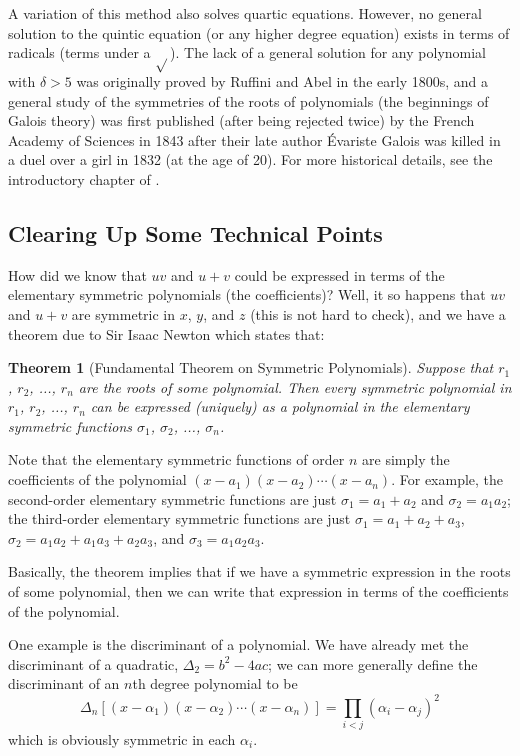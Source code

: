 \documentclass[a4paper,10pt,titlepage]{article}
\newtheorem*{thm}{Theorem}
\theoremstyle{definition}
\begin{document}
A variation of this method also solves quartic equations. However, no general solution to the
quintic equation (or any higher degree equation) exists in terms of radicals (terms under a $ \sqrt{} $).
The lack of a general solution for any polynomial with $ \delta > 5 $ was originally proved by Ruffini
and Abel in the early 1800s, and a general study of the symmetries of the roots of polynomials
(the beginnings of Galois theory) was first published (after being rejected twice) by the
French Academy of Sciences in 1843 after their late author \'Evariste Galois was killed in a duel
over a girl in 1832 (at the age of 20). For more historical details, see the introductory chapter
of \cite{Ste15}.

\subsection*{Clearing Up Some Technical Points}
How did we know that $ uv $ and $ u + v $ could be expressed in terms of the elementary
symmetric polynomials (the coefficients)? Well, it so happens that $ uv $ and $ u + v $ are
symmetric in $ x $, $ y $, and $ z $ (this is not hard to check), and we have a theorem due
to Sir Isaac Newton which states that:
\begin{thm}[Fundamental Theorem on Symmetric Polynomials]
  Suppose that $ r_1 $, $ r_2 $, ..., $ r_n $ are the roots of some polynomial. Then every
  symmetric polynomial in $ r_1 $, $ r_2 $, ..., $ r_n $ can be expressed (uniquely) as a polynomial
  in the elementary symmetric functions $ \sigma_1 $, $ \sigma_2 $, ..., $ \sigma_n $.
\end{thm}
Note that the elementary symmetric functions of order $ n $ are simply the coefficients of
the polynomial $ (x - a_1)(x - a_2) \cdots (x - a_n) $. For example, the second-order elementary
symmetric functions are just $ \sigma_1 = a_1 + a_2 $ and $ \sigma_2 = a_1 a_2 $; the third-order
elementary symmetric functions are just $ \sigma_1 = a_1 + a_2 + a_3 $, $ \sigma_2 = a_1 a_2 + a_1 a_3 + a_2 a_3 $,
and $ \sigma_3 = a_1 a_2 a_3 $.

Basically, the theorem implies that if we have a symmetric expression in the roots of some polynomial,
then we can write that expression in terms of the coefficients of the polynomial.

One example is the discriminant of a polynomial. We have already met the discriminant of a quadratic, $ \Delta_2 = b^2 - 4ac $;
we can more generally define the discriminant of an $ n$th degree polynomial to be
\begin{displaymath}
\Delta_n [(x - \alpha_1)(x - \alpha_2) \cdots (x - \alpha_n)] = \prod_{i < j}(\alpha_i - \alpha_j)^2
\end{displaymath}
which is obviously symmetric in each $ \alpha_i $.
\end{document}
